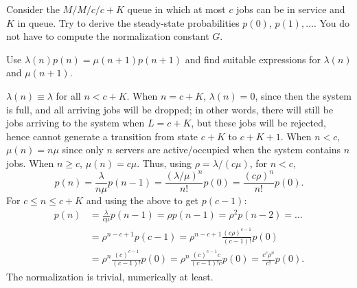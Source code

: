 \documentclass[companion]{subfiles}
\begin{document}
\begin{extra}
 Consider the $M/M/c/c+K$ queue in which at most $c$ jobs can be in service and $K$ in queue.
 Try to derive the steady-state probabilities $p(0)$, $p(1), \ldots$.
 You do not have to compute the normalization constant $G$.
\begin{hint}
Use $\lambda(n) p(n) = \mu(n+1)p(n+1)$ and
 find suitable expressions for $\lambda(n)$ and $\mu(n+1)$. 
\end{hint}
\begin{solution}
 $\lambda(n) \equiv \lambda$ for all $n<c+K$. When $n=c+K$,
 $\lambda(n)=0$, since then the system is full, and all arriving
 jobs will be dropped; in other words, there will still be jobs
 arriving to the system when $L=c+K$, but these jobs will be
 rejected, hence cannot generate a transition from state $c+K$ to
 $c+K+1$. When $n<c$, $\mu(n)=n \mu$ since only $n$ servers
 are active/occupied when the system contains $n$ jobs. When
 $n\geq c$, $\mu(n) = c \mu$. Thus, using $\rho=\lambda/(c\mu)$, for $n<c$,
 \begin{equation*}
 p(n) = \frac{\lambda}{n\mu} p(n-1) = \frac{(\lambda/\mu)^n}{n!} p(0)=\frac{(c\rho)^n}{n!}p(0).
 \end{equation*}
For $c\leq n\leq c+K$ and using the above to get $p(c-1)$:
 \begin{align*}
 p(n) &= \frac{\lambda}{c\mu} p(n-1) 
= \rho p(n-1) = \rho^2 p(n-2) = \ldots\\
&=\rho^{n-c+1} p(c-1) 
=\rho^{n-c+1} \frac{(c\rho)^{c-1}}{(c-1)!}p(0)\\
&=\rho^{n} \frac{(c)^{c-1}}{(c-1)!}p(0) 
=\rho^{n} \frac{(c)^{c-1}c}{(c-1)!c}p(0) =\frac{c^c \rho^n}{c!} p(0).
 \end{align*}
The normalization is trivial, numerically at least.
\end{solution}
\end{extra}
\end{document}
